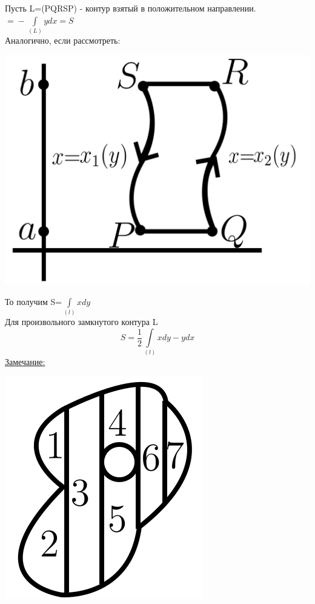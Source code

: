 \documentclass[12pt]{article}
\let\ORIincludegraphics\includegraphics
\renewcommand{\includegraphics}[2][]{\ORIincludegraphics[scale=0.65,#1]{#2}}
\let\oldint\int
\renewcommand{\int}{\oldint\limits}
\begin{document}
  \par
  Пусть L=(PQRSP) - контур взятый в положительном направлении. $\boxed{=}-\int_{(L)}ydx=S$\\
  Аналогично, если рассмотреть:
  \begin{flushleft}
    \includegraphics[scale=0.4]{8.5.2.png}
  \end{flushleft}
  То получим S=$\int_{(l)}xdy$\\
  Для произвольного замкнутого контура L\\
  \[\boxed{S=\frac{1}{2}\int_{(l)}xdy-ydx}\]
  \underline{Замечание:}
  \begin{flushleft}
      \includegraphics{8.5.3.png}
  \end{flushleft}
\end{document}

